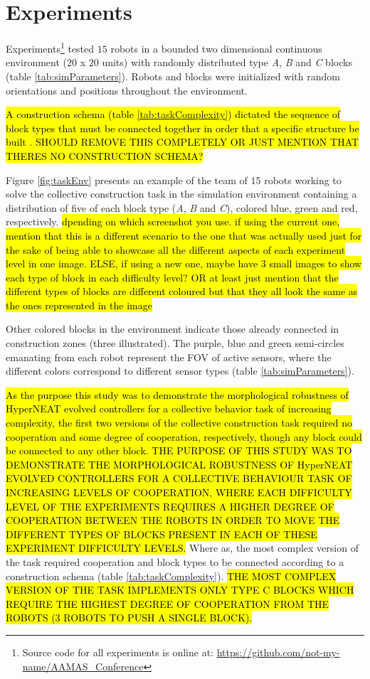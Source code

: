 \section{Experiments}\label{sec:experiments}

Experiments\footnote{Source code for all experiments is online at: \url{https://github.com/not-my-name/AAMAS_Conference}}
tested $15$ robots in a bounded two dimensional continuous environment
($20$ x $20$ units) with randomly distributed type \textit{A}, \textit{B} and
\textit{C} blocks (table \ref{tab:simParameters}).
Robots and blocks were initialized with random orientations and positions throughout the environment.

\hl{A construction schema (table \ref{tab:taskComplexity}) dictated the sequence of block
types that must be connected together in order that a specific structure be built \cite{NitschkeSaEC2012}. SHOULD REMOVE THIS COMPLETELY OR JUST MENTION THAT THERES NO CONSTRUCTION SCHEMA?}

Figure \ref{fig:taskEnv} presents an example of the team of $15$ robots working to solve the
collective construction task in the simulation environment containing a distribution of five of each
block type (\textit{A}, \textit{B} and \textit{C}), colored blue, green and red, respectively.
\hl{dpending on which screenshot you use. if using the current one, mention that this is a different scenario to the one that was actually used just for the sake of being able to showcase all the different aspects of each experiment level in one image. ELSE, if using a new one, maybe have 3 small images to show each type of block in each difficulty level? OR at least just mention that the different types of blocks are different coloured but that they all look the same as the ones represented in the image}

Other colored blocks in the environment indicate those already connected in construction zones
(three illustrated).  The purple, blue and green semi-circles emanating from each robot
represent the FOV of active sensors, where the different colors correspond to different
sensor types (table \ref{tab:simParameters}).

\hl{As the purpose this study was to demonstrate the morphological robustness of
HyperNEAT evolved controllers for a collective behavior task of increasing complexity,
the first two versions of the collective construction task required no cooperation and some degree of
cooperation, respectively, though any block could be connected to any other block. THE PURPOSE OF THIS STUDY WAS TO DEMONSTRATE THE MORPHOLOGICAL ROBUSTNESS OF HyperNEAT EVOLVED CONTROLLERS FOR A COLLECTIVE BEHAVIOUR TASK OF INCREASING LEVELS OF COOPERATION, WHERE EACH DIFFICULTY LEVEL OF THE EXPERIMENTS REQUIRES A HIGHER DEGREE OF COOPERATION BETWEEN THE ROBOTS IN ORDER TO MOVE THE DIFFERENT TYPES OF BLOCKS PRESENT IN EACH OF THESE EXPERIMENT DIFFICULTY LEVELS.}
Where as, the most complex version of the task required cooperation and block types
to be connected according to a construction schema (table \ref{tab:taskComplexity}). \hl{THE MOST COMPLEX VERSION OF THE TASK IMPLEMENTS ONLY TYPE C BLOCKS WHICH REQUIRE THE HIGHEST DEGREE OF COOPERATION FROM THE ROBOTS (3 ROBOTS TO PUSH A SINGLE BLOCK).}


